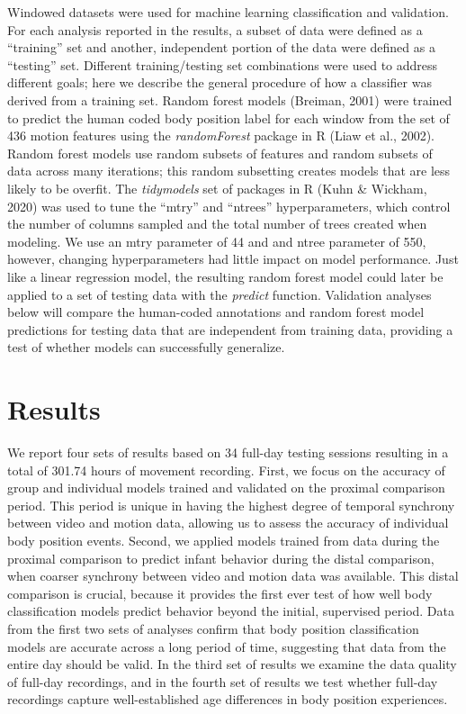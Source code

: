 \documentclass[
  man]{apa6}
\begin{document}
Windowed datasets were used for machine learning classification and validation. For each analysis reported in the results, a subset of data were defined as a ``training'' set and another, independent portion of the data were defined as a ``testing'' set. Different training/testing set combinations were used to address different goals; here we describe the general procedure of how a classifier was derived from a training set. Random forest models (Breiman, 2001) were trained to predict the human coded body position label for each window from the set of 436 motion features using the \emph{randomForest} package in R (Liaw et al., 2002). Random forest models use random subsets of features and random subsets of data across many iterations; this random subsetting creates models that are less likely to be overfit. The \emph{tidymodels} set of packages in R (Kuhn \& Wickham, 2020) was used to tune the ``mtry'' and ``ntrees'' hyperparameters, which control the number of columns sampled and the total number of trees created when modeling. We use an mtry parameter of 44 and and ntree parameter of 550, however, changing hyperparameters had little impact on model performance. Just like a linear regression model, the resulting random forest model could later be applied to a set of testing data with the \emph{predict} function. Validation analyses below will compare the human-coded annotations and random forest model predictions for testing data that are independent from training data, providing a test of whether models can successfully generalize.

\hypertarget{results}{%
\section{Results}\label{results}}

We report four sets of results based on 34 full-day testing sessions resulting in a total of 301.74 hours of movement recording. First, we focus on the accuracy of group and individual models trained and validated on the proximal comparison period. This period is unique in having the highest degree of temporal synchrony between video and motion data, allowing us to assess the accuracy of individual body position events. Second, we applied models trained from data during the proximal comparison to predict infant behavior during the distal comparison, when coarser synchrony between video and motion data was available. This distal comparison is crucial, because it provides the first ever test of how well body classification models predict behavior beyond the initial, supervised period. Data from the first two sets of analyses confirm that body position classification models are accurate across a long period of time, suggesting that data from the entire day should be valid. In the third set of results we examine the data quality of full-day recordings, and in the fourth set of results we test whether full-day recordings capture well-established age differences in body position experiences.
\end{document}
